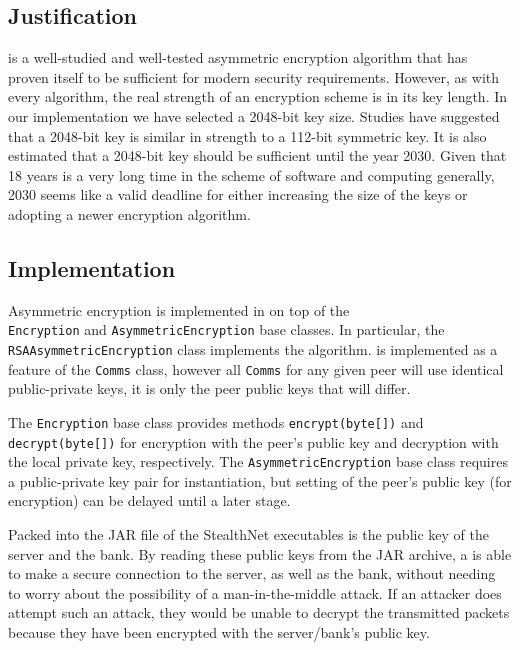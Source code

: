 \documentclass[a4paper,11pt]{article}
\begin{document}
\subsection{Justification}
 is a well-studied and well-tested asymmetric encryption 
algorithm that has proven itself to be sufficient for modern security 
requirements. However, as with every algorithm, the real strength of an 
encryption scheme is in its key length. In our implementation we have selected a
2048-bit key size. Studies have suggested that a 2048-bit  key is 
similar in strength to a 112-bit symmetric key. It is also estimated that a 
2048-bit key should be sufficient until the year 2030. Given that 18 years is a 
very long time in the scheme of software and computing generally, 2030 seems 
like a valid deadline for either increasing the size of the  keys
or adopting a newer encryption algorithm.

\subsection{Implementation}
Asymmetric encryption is implemented in \packageName{} on top of the \\
\verb+Encryption+ and \verb+AsymmetricEncryption+ base classes. In particular, 
the \\ \verb+RSAAsymmetricEncryption+ class implements the  
algorithm.  is implemented as a feature of the 
\serviceName{} \verb+Comms+ class, however all \verb+Comms+ for any given 
\serviceName{} peer will use identical public-private keys, it is only the peer 
public keys that will differ.

The \verb+Encryption+ base class provides methods \verb+encrypt(byte[])+ and 
\verb+decrypt(byte[])+ for encryption with the peer's public key and decryption 
with the local private key, respectively.  The \verb+AsymmetricEncryption+ base 
class requires a public-private key pair for instantiation, but setting of the 
peer's public key (for encryption) can be delayed until a later stage.

Packed into the JAR file of the StealthNet executables is the public key of the 
\serviceName{} server and the \serviceName{} bank. By reading these public keys 
from the JAR archive, a \serviceName{} is able to make a secure connection to 
the \serviceName{} server, as well as the \serviceName{} bank, without needing 
to worry about the possibility of a man-in-the-middle attack. If an attacker 
does attempt such an attack, they would be unable to decrypt the transmitted 
packets because they have been encrypted with the server/bank's public key.
\end{document}
